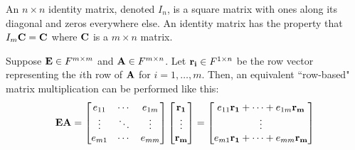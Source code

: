 \documentclass[../main.tex]{subfiles}
\begin{document}
\begin{definition}
	An $n\times n$ identity matrix,
	denoted $I_n$, is a square matrix with ones along its diagonal and zeros everywhere else. An identity matrix
	has the property that $I_m\mathbf{C}=\mathbf{C}$ where $\mathbf{C}$ is a $m\times n$ matrix.
\end{definition}

\begin{theorem}
	Suppose $\mathbf{E} \in F^{m\times m}$ and $\mathbf{A} \in F^{m\times n}$. Let $\mathbf{r_i} \in F^{1\times n}$
	be the row vector representing the $i$th row of $\mathbf{A}$ for $i=1,\ldots,m$.
	Then, an equivalent ``row-based" matrix multiplication can be performed like this:
	\[\mathbf{E}\mathbf{A}=\begin{bmatrix}e_{11} & \cdots & e_{1m} \\
               \vdots & \ddots & \vdots \\
               e_{m1} & \cdots & e_{mm}\end{bmatrix}
		\begin{bmatrix}\mathbf{r_1}\\\vdots\\\mathbf{r_m}\end{bmatrix}
		=\begin{bmatrix}e_{11}\mathbf{r_1}+\cdots +e_{1m}\mathbf{r_m}\\\vdots\\e_{m1}\mathbf{r_1}+\cdots +e_{mm}\mathbf{r_m}\end{bmatrix}\]
\end{theorem}
\end{document}
